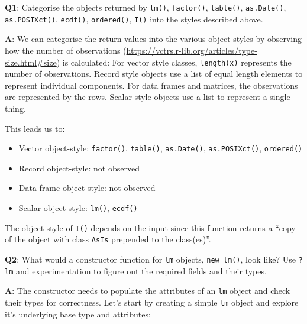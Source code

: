 \documentclass[
]{krantz}
\makeatletter
\newenvironment{Shaded}{\begin{snugshade}}{\end{snugshade}}
\newcommand{\CommentTok}[1]{\textcolor[rgb]{0.56,0.35,0.01}{\textit{#1}}}
\newcommand{\DataTypeTok}[1]{\textcolor[rgb]{0.13,0.29,0.53}{#1}}
\newcommand{\KeywordTok}[1]{\textcolor[rgb]{0.13,0.29,0.53}{\textbf{#1}}}
\newcommand{\NormalTok}[1]{#1}
\newcommand{\OperatorTok}[1]{\textcolor[rgb]{0.81,0.36,0.00}{\textbf{#1}}}
\newcommand{\StringTok}[1]{\textcolor[rgb]{0.31,0.60,0.02}{#1}}
\providecommand{\tightlist}{%
  \setlength{\itemsep}{0pt}\setlength{\parskip}{0pt}}
\renewcommand{\href}[2]{#2 (\url{#1})}
\newenvironment{kframe}{%
\medskip{}
\setlength{\fboxsep}{.8em}
 \def\at@end@of@kframe{}%
 \ifinner\ifhmode%
  \def\at@end@of@kframe{\end{minipage}}%
  \begin{minipage}{\columnwidth}%
 \fi\fi%
 \def\FrameCommand##1{\hskip\@totalleftmargin \hskip-\fboxsep
 \colorbox{shadecolor}{##1}\hskip-\fboxsep
     \hskip-\linewidth \hskip-\@totalleftmargin \hskip\columnwidth}%
 \MakeFramed {\advance\hsize-\width
   \@totalleftmargin\z@ \linewidth\hsize
   \@setminipage}}%
 {\par\unskip\endMakeFramed%
 \at@end@of@kframe}
\renewenvironment{Shaded}{\begin{kframe}}{\end{kframe}}
\renewcommand{\KeywordTok} [1]{\textcolor[rgb]{0.00,0.44,0.13}{{#1}}}
\renewcommand{\DataTypeTok}[1]{\textcolor[rgb]{0.56,0.13,0.00}{{#1}}}
\renewcommand{\StringTok}  [1]{\textcolor[rgb]{0.25,0.44,0.63}{{#1}}}
\renewcommand{\CommentTok} [1]{\textcolor[rgb]{0.38,0.63,0.69}{{#1}}}
\renewcommand{\NormalTok}  [1]{{#1}}
\makeatother
\begin{document}
\textbf{{Q1}}: Categorise the objects returned by \texttt{lm()}, \texttt{factor()}, \texttt{table()}, \texttt{as.Date()}, \texttt{as.POSIXct()}, \texttt{ecdf()}, \texttt{ordered()}, \texttt{I()} into the styles described above.

\textbf{{A}}: We can categorise the return values into the various object styles by observing how the \href{https://vctrs.r-lib.org/articles/type-size.html\#size}{number of observations} is calculated: For vector style classes, \texttt{length(x)} represents the number of observations. Record style objects use a list of equal length elements to represent individual components. For data frames and matrices, the observations are represented by the rows. Scalar style objects use a list to represent a single thing.

This leads us to:

\begin{itemize}
\tightlist
\item
  Vector object-style: \texttt{factor()}, \texttt{table()}, \texttt{as.Date()}, \texttt{as.POSIXct()}, \texttt{ordered()}
\item
  Record object-style: not observed
\item
  Data frame object-style: not observed
\item
  Scalar object-style: \texttt{lm()}, \texttt{ecdf()}
\end{itemize}

The object style of \texttt{I()} depends on the input since this function returns a ``copy of the object with class \texttt{AsIs} prepended to the class(es)''.

\textbf{{Q2}}: What would a constructor function for \texttt{lm} objects, \texttt{new\_lm()}, look like? Use \texttt{?lm} and experimentation to figure out the required fields and their types.

\textbf{{A}}: The constructor needs to populate the attributes of an \texttt{lm} object and check their types for correctness. Let's start by creating a simple \texttt{lm} object and explore it's underlying base type and attributes:

\begin{Shaded}
\end{Shaded}
\end{document}
